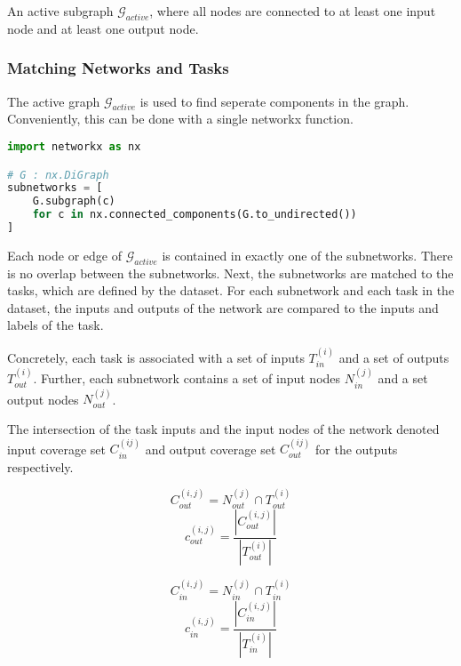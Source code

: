 An active subgraph $\mathcal{G}_{active}$, where all nodes are connected to at least one input node and at least one output node.

\subsubsection{Matching Networks and Tasks}
The active graph $\mathcal{G}_{active}$ is used to find seperate components in the graph.
Conveniently, this can be done with a single networkx function.
\begin{lstlisting}[language=Python]
import networkx as nx

# G : nx.DiGraph
subnetworks = [
    G.subgraph(c) 
    for c in nx.connected_components(G.to_undirected())
]
\end{lstlisting}

Each node or edge of $\mathcal{G}_{active}$ is contained in exactly one of the subnetworks.
There is no overlap between the subnetworks.
Next, the subnetworks are matched to the tasks, which are defined by the dataset.
For each subnetwork and each task in the dataset, the inputs and outputs of the network are compared to the inputs and labels of the task.

Concretely, each task is associated with a set of inputs $T^{(i)}_{in}$ and a set of outputs $T^{(i)}_{out}$.
Further, each subnetwork contains a set of input nodes $N^{(j)}_{in}$ and a set output nodes $N^{(j)}_{out}$.

The intersection of the task inputs and the input nodes of the network denoted input coverage set $C^{(ij)}_{in}$ and output coverage set $C^{(ij)}_{out}$ for the outputs respectively.

$$
C^{(i,j)}_{out} = N^{(j)}_{out} \cap T^{(i)}_{out}
$$
$$
c^{(i,j)}_{out} = \frac{| C^{(i,j)}_{out} |}{|T^{(i)}_{out}|}
$$

$$
C^{(i,j)}_{in}  = N^{(j)}_{in}  \cap T^{(i)}_{in}
$$
$$
c^{(i,j)}_{in} = \frac{| C^{(i,j)}_{in} |}{|T^{(i)}_{in}|}
$$

